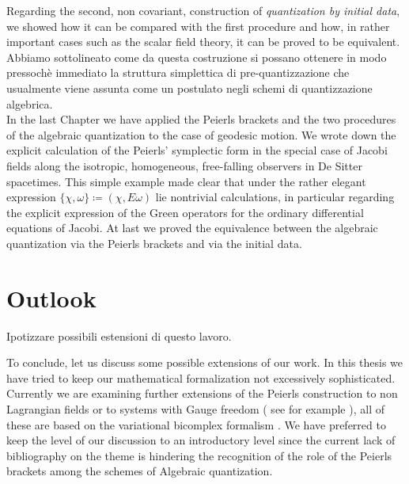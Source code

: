 \documentclass[Main]{subfiles}
\begin{document}
Regarding the second, non covariant, construction of \emph{quantization by initial data}, we showed how it can be compared with the first procedure and how, in rather important cases such as the scalar field theory, it can be proved to be equivalent.
\ifToninus
Abbiamo sottolineato come da questa costruzione si possano ottenere in modo pressochè immediato la struttura simplettica di pre-quantizzazione che usualmente viene assunta come un postulato negli schemi di quantizzazione algebrica.
\fi
\\
In the last Chapter we have applied the Peierls brackets and the two procedures of the algebraic quantization to the case of geodesic motion.
We wrote down the explicit calculation of the Peierls' symplectic form in the special case of Jacobi fields along the isotropic, homogeneous, free-falling  observers in De Sitter spacetimes. This simple example made clear that under the rather elegant expression $\{\chi, \omega\} \coloneqq ( \chi, E \omega)$ lie nontrivial calculations, in particular regarding the explicit expression of the Green operators for the ordinary differential equations of Jacobi.
At last we proved the equivalence between the algebraic quantization via the Peierls brackets and via the initial data.

\vspace{2mm}%

\ifToninus
\section{Outlook}
Ipotizzare possibili estensioni di questo lavoro.

\fi
To conclude, let us discuss  some possible extensions of our work.
	In this thesis we have tried to keep our mathematical formalization not excessively sophisticated. 
	Currently we are examining further extensions of the Peierls construction to non Lagrangian fields or to systems with Gauge freedom ( see for example \cite{Khavkine2014} ), all of these are based on the variational bicomplex formalism \cite{G.Sardanashvily2013}.
	We have preferred to keep the level of our discussion to an introductory level since the current lack of bibliography on the theme is hindering the recognition of the role of the Peierls brackets among the schemes of Algebraic quantization.
	
\end{document}
